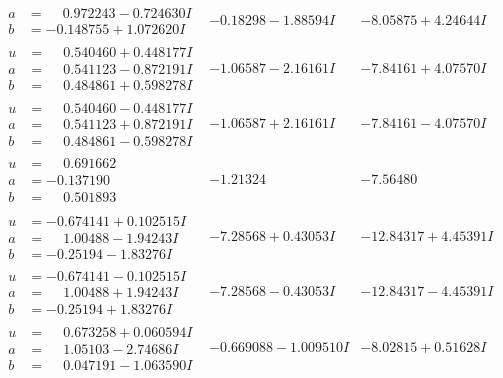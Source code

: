 \documentclass[1p]{elsarticle_modified}
\theoremstyle{definition}
\begin{document}
$$\begin{array}{c|c|c}
\begin{aligned}
a &= \phantom{-}0.972243 - 0.724630 I \\
b &= -0.148755 + 1.072620 I\end{aligned}
 & -0.18298 - 1.88594 I & -8.05875 + 4.24644 I \\ \hline\begin{aligned}
u &= \phantom{-}0.540460 + 0.448177 I \\
a &= \phantom{-}0.541123 - 0.872191 I \\
b &= \phantom{-}0.484861 + 0.598278 I\end{aligned}
 & -1.06587 - 2.16161 I & -7.84161 + 4.07570 I \\ \hline\begin{aligned}
u &= \phantom{-}0.540460 - 0.448177 I \\
a &= \phantom{-}0.541123 + 0.872191 I \\
b &= \phantom{-}0.484861 - 0.598278 I\end{aligned}
 & -1.06587 + 2.16161 I & -7.84161 - 4.07570 I \\ \hline\begin{aligned}
u &= \phantom{-}0.691662\phantom{ +0.000000I} \\
a &= -0.137190\phantom{ +0.000000I} \\
b &= \phantom{-}0.501893\phantom{ +0.000000I}\end{aligned}
 & -1.21324\phantom{ +0.000000I} & -7.56480\phantom{ +0.000000I} \\ \hline\begin{aligned}
u &= -0.674141 + 0.102515 I \\
a &= \phantom{-}1.00488 - 1.94243 I \\
b &= -0.25194 - 1.83276 I\end{aligned}
 & -7.28568 + 0.43053 I & -12.84317 + 4.45391 I \\ \hline\begin{aligned}
u &= -0.674141 - 0.102515 I \\
a &= \phantom{-}1.00488 + 1.94243 I \\
b &= -0.25194 + 1.83276 I\end{aligned}
 & -7.28568 - 0.43053 I & -12.84317 - 4.45391 I \\ \hline\begin{aligned}
u &= \phantom{-}0.673258 + 0.060594 I \\
a &= \phantom{-}1.05103 - 2.74686 I \\
b &= \phantom{-}0.047191 - 1.063590 I\end{aligned}
 & -0.669088 - 1.009510 I & -8.02815 + 0.51628 I \\ \hline\begin{aligned}

\end{aligned}
\end{array}$$
\end{document}
